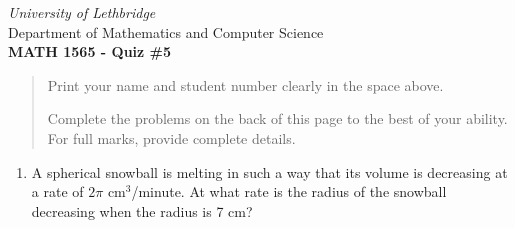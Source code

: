 \documentclass[12pt]{article}
\newcommand{\skipline}{\vspace{12pt}}
\begin{document}
\thispagestyle{empty}
\begin{center}
\emph{University of Lethbridge}\\
Department of Mathematics and Computer Science\\
{\bf MATH 1565 - Quiz \#5}\\
\end{center}



\vspace{0.1in}

\vspace*{\fill}

\begin{quote}
Print your name and student number clearly in the space above. 

\medskip

Complete the problems on the back of this page to the best of your ability.
For full marks, provide complete details.

\medskip

\end{quote}
\newpage
\thispagestyle{empty}
\begin{enumerate}
%  
 \item A spherical snowball is melting in such a way that its volume is decreasing 
 at a rate of $2\pi$ $\text{cm}^3$/minute. At what rate is the radius of the snowball decreasing when 
 the radius is 7 cm?
 
 
%  
 
 \end{enumerate}
\end{document}
